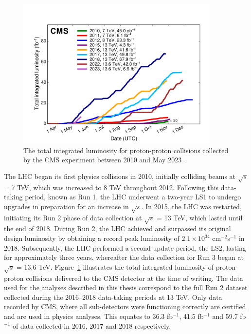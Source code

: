 \begin{figure}[t]
    \centering
    \includegraphics[width=0.9\textwidth]{Figures/int_lumi_cumulative_pp_2.pdf}
    \caption[Plot of the total integrated luminosity collected by the CMS experiment.]{The total integrated luminosity for proton-proton collisions collected by the \ac{CMS} experiment between 2010 and May 2023~\cite{lumi}.}
    \label{fig:int_lumi}
\end{figure}

The \ac{LHC} began its first physics collisions in 2010, initially colliding beams at $\sqrt{s}$ = 7 TeV, which was increased to 8 TeV throughout 2012. 
Following this data-taking period, known as Run 1, the \ac{LHC} underwent a two-year \ac{LS1} to undergo upgrades in preparation for an increase in $\sqrt{s}$. 
In 2015, the \ac{LHC} was restarted, initiating its Run 2 phase of data collection at $\sqrt{s}$ = 13 TeV, which lasted until the end of 2018. 
During Run 2, the \ac{LHC} achieved and surpassed its original design luminosity by obtaining a record peak luminosity of $2.1\times10^{34}$ cm$^{−2}$s$^{−1}$ in 2018.
Subsequently, the \ac{LHC} performed a second update period, the \ac{LS2}, lasting for approximately three years, whereafter the data collection for Run 3 began at $\sqrt{s}$ = 13.6 TeV.
Figure~\ref{fig:int_lumi} illustrates the total integrated luminosity of proton-proton collisions delivered to the \ac{CMS} detector at the time of writing.
The data used for the analyses described in this thesis correspond to the full Run 2 dataset collected during the 2016--2018 data-taking periods at 13 TeV. 
Only data recorded by \ac{CMS}, where all sub-detectors were functioning correctly are certified and are used in physics analyses. 
This equates to 36.3 fb$^{−1}$, 41.5 fb$^{−1}$ and 59.7 fb$^{-1}$ of data collected in 2016, 2017 and 2018 respectively. \\

